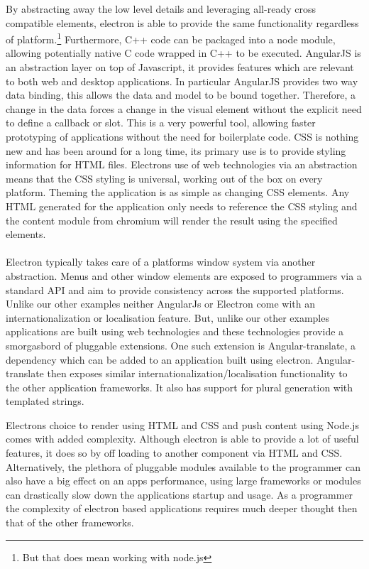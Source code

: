   By abstracting away the low level details and leveraging all-ready cross compatible elements, electron is able to provide the same functionality regardless of platform.\footnote{But that does mean working with node.js} Furthermore, C++ code can be packaged into a node module, allowing potentially native C code wrapped in C++ to be executed.
  AngularJS is an abstraction layer on top of Javascript, it provides features which are relevant to both web and desktop applications. In particular AngularJS provides two way data binding, this allows the data and model to be bound together. Therefore, a change in the data forces a change in the visual element without the explicit need to define a callback or slot. This is a very powerful tool, allowing faster prototyping of applications without the need for boilerplate code.
  CSS is nothing new and has been around for a long time, its primary use is to provide styling information for HTML files. Electrons use of web technologies via an abstraction means that the CSS styling is universal, working out of the box on every platform. Theming the application is as simple as changing CSS elements. Any HTML generated for the application only needs to reference the CSS styling and the content module from chromium will render the result using the specified elements.\\\\
  Electron typically takes care of a platforms window system via another abstraction. Menus and other window elements are exposed to programmers via a standard API and aim to provide consistency across the supported platforms.
  Unlike our other examples neither AngularJs or Electron come with an internationalization or localisation feature. But, unlike our other examples applications are built using web technologies and these technologies provide a smorgasbord of pluggable extensions. One such extension is Angular-translate, a dependency which can be added to an application built using electron. Angular-translate then exposes similar internationalization/localisation functionality to the other application frameworks. It also has support for plural generation with templated strings.

  Electrons choice to render using HTML and CSS and push content using Node.js comes with added complexity. Although electron is able to provide a lot of useful features, it does so by off loading to another component via HTML and CSS. Alternatively, the plethora of pluggable modules available to the programmer can also have a big effect on an apps performance, using large frameworks or modules can drastically slow down the applications startup and usage. As a programmer the complexity of electron based applications requires much deeper thought then that of the other frameworks.

